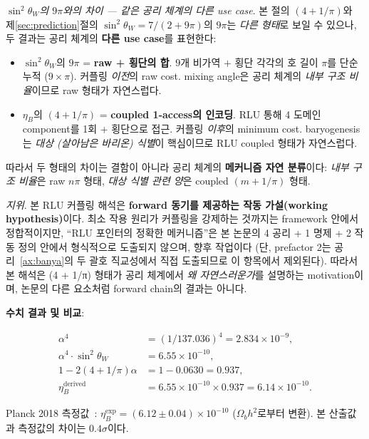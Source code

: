 \documentclass[entropy,article,submit,pdftex,oneauthor]{Definitions/mdpi}
\begin{document}
\emph{$\sin^2\theta_W$의 $9\pi$와의 차이 — 같은 공리 체계의 다른 use case}. 본 절의 $(4 + 1/\pi)$와 제\ref{sec:prediction}절의 $\sin^2\theta_W = 7/(2 + 9\pi)$의 $9\pi$는 \emph{다른 형태}로 보일 수 있으나, 두 결과는 공리 체계의 \textbf{다른 use case}를 표현한다:

\begin{itemize}
\item $\sin^2\theta_W$의 $9\pi$ = \textbf{raw + 횡단의 합}. $9$개 비가역 $+$ 횡단 각각의 호 길이 $\pi$를 단순 누적 ($9 \times \pi$). 커플링 \emph{이전}의 raw cost. mixing angle은 공리 체계의 \emph{내부 구조 비율}이므로 raw 형태가 자연스럽다.
\item $\eta_B$의 $(4 + 1/\pi)$ = \textbf{coupled 1-access의 인코딩}. RLU 통해 4 도메인 component를 1회 + 횡단으로 접근. 커플링 \emph{이후}의 minimum cost. baryogenesis는 \emph{대상 (살아남은 바리온) 식별}이 핵심이므로 RLU coupled 형태가 자연스럽다.
\end{itemize}

따라서 두 형태의 차이는 결함이 아니라 공리 체계의 \textbf{메커니즘 자연 분류}이다: \emph{내부 구조 비율}은 raw $n\pi$ 형태, \emph{대상 식별 관련 양}은 coupled $(m + 1/\pi)$ 형태.

\emph{지위}. 본 RLU 커플링 해석은 \textbf{forward 동기를 제공하는 작동 가설(working hypothesis)}이다. 최소 작용 원리가 커플링을 강제하는 것까지는 framework 안에서 정합적이지만, ``RLU 포인터의 정확한 메커니즘''은 본 논문의 4 공리 + 1 명제 + 2 작동 정의 안에서 형식적으로 도출되지 않으며, 향후 작업이다 (단, prefactor 2는 공리~\ref{ax:banya}의 두 괄호 직교성에서 직접 도출되므로 이 항목에서 제외된다). 따라서 본 해석은 (4 + 1/π) 형태가 공리 체계에서 \emph{왜 자연스러운가}를 설명하는 motivation이며, 논문의 다른 요소처럼 forward chain의 결과는 아니다.

\textbf{수치 결과 및 비교}:
\begin{linenomath}
\begin{align}
\alpha^4 &= (1/137.036)^4 = 2.834 \times 10^{-9}, \nonumber \\
\alpha^4 \cdot \sin^2\theta_W &= 6.55 \times 10^{-10}, \nonumber \\
1 - 2(4+1/\pi)\alpha &= 1 - 0.0630 = 0.937, \nonumber \\
\eta_B^{\text{derived}} &= 6.55 \times 10^{-10} \times 0.937 = 6.14 \times 10^{-10}.
\end{align}
\end{linenomath}

Planck 2018 측정값~\cite{pdg2024}: $\eta_B^{\text{exp}} = (6.12 \pm 0.04) \times 10^{-10}$ ($\Omega_b h^2$로부터 변환). 본 산출값과 측정값의 차이는 $0.4\sigma$이다.
\end{document}

